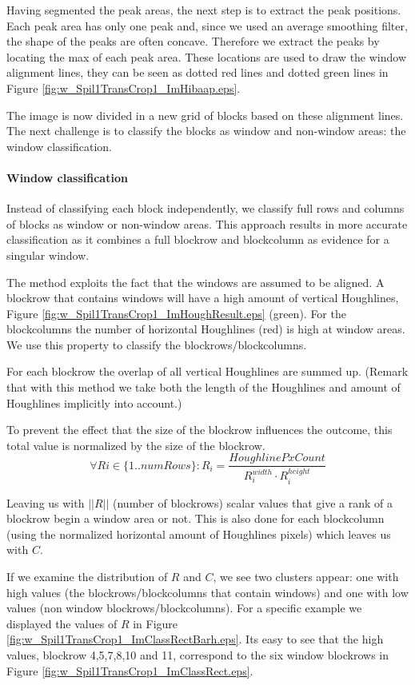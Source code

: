 Having segmented the peak areas, the next step is to extract the peak positions. 
Each peak area has only one peak and, since we used an average smoothing filter, the shape of 
the peaks are often concave. Therefore we extract the peaks by locating the max of each peak area. 
These locations are used to draw the window alignment lines, they can be seen
as dotted red lines and dotted green lines in Figure \ref{fig:w_Spil1TransCrop1_ImHibaap.eps}.

The image is now divided in a new grid of blocks based on these
alignment lines. The next challenge is to classify the blocks as window and
non-window areas: the window classification.

\paragraph{Window classification}
Instead of classifying each block independently, we classify full rows and
columns of blocks as window or non-window areas.  This approach results in more accurate
classification as it combines a full blockrow and blockcolumn as evidence for a singular
window. 

The method exploits the fact that the windows are assumed to be
aligned.
A blockrow that contains windows will have a high amount of vertical
Houghlines, Figure \ref{fig:w_Spil1TransCrop1_ImHoughResult.eps}
(green). For the blockcolumns the number of horizontal Houghlines
 (red) is high at window areas.  We use this property to classify 
 the blockrows/blockcolumns. 

For each blockrow the overlap of all vertical Houghlines are summed up.
(Remark that with this method we take both the length of the Houghlines and
amount of Houghlines implicitly into account.)

To prevent the effect that the size of the blockrow influences the outcome, this total value
is normalized by the size of the blockrow.
\[\forall Ri\in \{1..numRows\} : R_i = \frac{HoughlinePxCount}{R_i^{width} \cdot R_i^{height}}\]

Leaving us with $||R||$ (number of blockrows) scalar values that give a rank of a blockrow begin a window area or not.
This is also done for each blockcolumn (using the normalized horizontal amount of
Houghlines pixels) which leaves us with $C$.

If we examine the distribution of $R$ and $C$, we see two clusters appear: one with
high values (the blockrows/blockcolumns that contain windows) and one with low values (non window
blockrows/blockcolumns). For a specific example we displayed the values of $R$ in Figure \ref{fig:w_Spil1TransCrop1_ImClassRectBarh.eps}.
Its easy to see that the high values, blockrow 4,5,7,8,10 and 11, correspond to the
six window blockrows in Figure \ref{fig:w_Spil1TransCrop1_ImClassRect.eps}.

